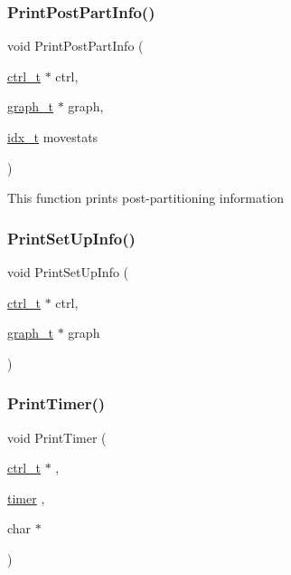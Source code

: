 \mbox{\label{a00951_a6f0fa911c3fe611186b0233e2bb19555}} 
\subsubsection{\texorpdfstring{Print\+Post\+Part\+Info()}{PrintPostPartInfo()}}
{\footnotesize\ttfamily void Print\+Post\+Part\+Info (\begin{DoxyParamCaption}\item[{\hyperlink{a00742}{ctrl\+\_\+t} $\ast$}]{ctrl,  }\item[{\hyperlink{a00734}{graph\+\_\+t} $\ast$}]{graph,  }\item[{\hyperlink{a00876_aaa5262be3e700770163401acb0150f52}{idx\+\_\+t}}]{movestats }\end{DoxyParamCaption})}

This function prints post-\/partitioning information \mbox{\label{a00951_ac254342a49647a11cce3e8e055df0d11}} 
\subsubsection{\texorpdfstring{Print\+Set\+Up\+Info()}{PrintSetUpInfo()}}
{\footnotesize\ttfamily void Print\+Set\+Up\+Info (\begin{DoxyParamCaption}\item[{\hyperlink{a00742}{ctrl\+\_\+t} $\ast$}]{ctrl,  }\item[{\hyperlink{a00734}{graph\+\_\+t} $\ast$}]{graph }\end{DoxyParamCaption})}

\mbox{\label{a00951_a8a9ea6599a196d0ef23ba44827e50028}} 
\subsubsection{\texorpdfstring{Print\+Timer()}{PrintTimer()}}
{\footnotesize\ttfamily void Print\+Timer (\begin{DoxyParamCaption}\item[{\hyperlink{a00742}{ctrl\+\_\+t} $\ast$}]{,  }\item[{\hyperlink{a00978_aae821c36bb7e6918e1414484f939c3d4}{timer}}]{,  }\item[{char $\ast$}]{ }\end{DoxyParamCaption})}

